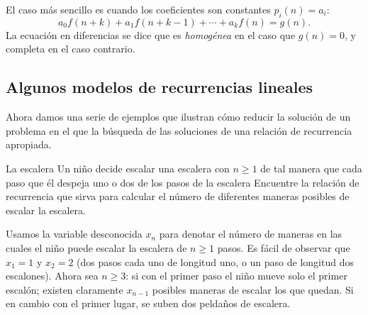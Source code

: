 El caso más sencillo es cuando los coeficientes son constantes $p_{i}(n)=a_{i}$:
\begin{equation*}
a_{0}f(n+k)+a_{1}f(n+k-1)+\cdots+a_{k}f(n)=g(n).
\end{equation*}
La ecuación en diferencias se dice que es \emph{homogénea} en el caso que $g(n)=0$, y completa en el caso contrario.

\subsection{Algunos modelos de recurrencias lineales}

Ahora damos una serie de ejemplos que ilustran cómo reducir la solución de un problema en el que la búsqueda de las soluciones de una relación de recurrencia apropiada.

\begin{example}{La escalera}
	Un niño decide escalar una escalera con $n\geq 1$ de tal manera que cada paso que él despeja uno o dos de los pasos de la escalera %
	Encuentre la relación de recurrencia que sirva para calcular el número de diferentes maneras posibles de escalar la escalera.
\end{example}

\begin{solution}
	Usamos la variable desconocida $x_{n}$ para denotar el número de maneras en las cuales el niño puede escalar la escalera de $n\geq1$ pasos. Es fácil de observar que $x_{1}=1$ y $x_{2}=2$ (dos pasos cada uno de longitud uno, o un paso de longitud dos escalones). Ahora sea $n\geq3$: si con el primer paso el niño mueve solo el primer escalón; existen claramente $x_{n-1}$ posibles maneras de escalar los que quedan. Si en cambio con el primer lugar, se suben dos peldaños de escalera.
\end{solution}
%
%
%
%
%
%
%
%
%


